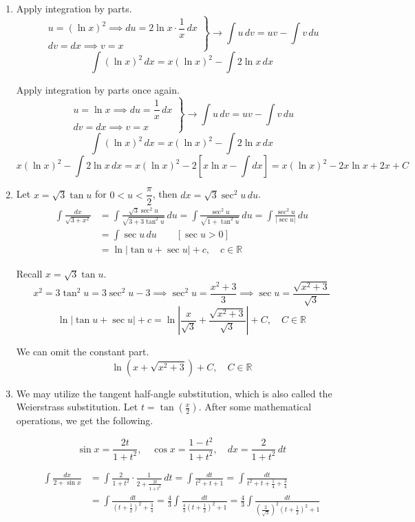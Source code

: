 \documentclass[a4paper, 12pt]{article}
\begin{document}
\begin{enumerate}[leftmargin=*,label=\textbf{\arabic*.}]
\begin{enumerate}[leftmargin=*,label=\textbf{\alph*.}]
\item Apply integration by parts.
\[\left.\begin{array}{c}
u=(\ln x)^2\implies du=2\ln x\cdot\dfrac1x\,dx\\
dv=dx\implies v=x
\end{array}\right\}\rightarrow \int u\,dv=uv-\int v\,du\]
\[\int(\ln x)^2\,dx=x(\ln x)^2-\int2\ln x\,dx\]

Apply integration by parts once again.
\[\left.\begin{array}{c}
u=\ln x\implies du=\dfrac1x\,dx\\
dv=dx\implies v=x
\end{array}\right\}\rightarrow \int u\,dv=uv-\int v\,du\]
\[\int(\ln x)^2\,dx=x(\ln x)^2-\int2\ln x\,dx\]
\[x(\ln x)^2-\int2\ln x\,dx=x(\ln x)^2-2\left[x\ln x-\int dx\right]=\boxed{x(\ln x)^2-2x\ln x+2x+C}\]

\item Let $x=\sqrt3\tan u$ for $0<u<\dfrac\pi2$, then $dx=\sqrt3\sec^2u\,du$.
\begin{align*}\int\frac{dx}{\sqrt{3+x^2}}&=\int\frac{\sqrt3\sec^2u}{\sqrt{3+3\tan^2u}}\,du=\int\frac{\sec^2u}{\sqrt{1+\tan^2u}}\,du=\int\frac{\sec^2u}{\left|\sec u\right|}\,du\\[1em]&=\int\sec u\,du\qquad\left[\sec u>0\right]\\[1em]&=\ln\left|\tan u+\sec u\right|+c,\quad c\in\mathbb{R}\end{align*}

Recall $x=\sqrt3\tan u$.
\[x^2=3\tan^2u=3\sec^2u-3\implies \sec^2u=\frac{x^2+3}3\implies\sec u=\frac{\sqrt{x^2+3}}{\sqrt3}\]
\[\ln\left|\tan u+\sec u\right|+c=\boxed{\ln\left|\frac{x}{\sqrt3}+\frac{\sqrt{x^2+3}}{\sqrt3}\right|+C,\quad C\in\mathbb{R}}\]

We can omit the constant part.
\[\boxed{\ln\left(x+\sqrt{x^2+3}\right)+C,\quad C\in\mathbb{R}}\]

\item We may utilize the tangent half-angle substitution, which is also called the Weierstrass substitution. Let $\displaystyle t=\tan\left(\frac x2\right)$. After some mathematical operations, we get the following.

\[\sin x={\frac{2t}{1+t^{2}}},\quad\cos x={\frac{1-t^{2}}{1+t^{2}}},\quad dx={\frac2{1+t^{2}}}\,dt\]

\begin{align*}\int\frac{dx}{2+\sin x}&=\int\frac2{1+t^2}\cdot\frac1{2+\frac{2t}{1+t^2}}\,dt=\int\frac{dt}{t^2+t+1}=\int\frac{dt}{t^2+t+\frac14+\frac34}\\[1em]&=\int\frac{dt}{\left(t+\frac12\right)^2+\frac34}=\frac43\int\frac{dt}{\frac43\left(t+\frac12\right)^2+1}=\frac43\int\frac{dt}{\left(\frac2{\sqrt3}\right)^2\left(t+\frac12\right)^2+1}\end{align*}


\end{enumerate}
\end{enumerate}
\end{document}
